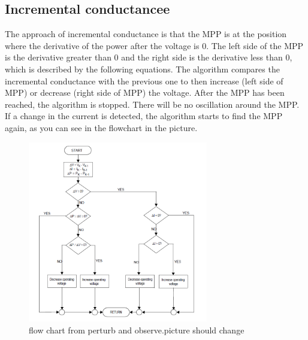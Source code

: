 \subsection{Incremental conductancee}
The approach of incremental conductance is that the MPP is at the position where the derivative of the power after the voltage is 0. The left side of the MPP is the derivative greater than 0 and the right side is the derivative less than 0, which is described by the following equations. The algorithm compares the incremental conductance with the previous one to then increase (left side of MPP) or decrease (right side of MPP) the voltage.  After the MPP has been reached, the algorithm is stopped. There will be no oscillation around the MPP. If a change in the current is detected, the algorithm starts to find the MPP again, as you can see in the flowchart in the picture.

\begin{figure}[htbp]
	\begin{center}
		\includegraphics[width=0.7\textwidth]{../Pictures/P1/Flow_chart/flow_chart_incremental_conductance}
		\caption{flow chart from perturb and observe.picture should change }
		\label{fcinccon}
	\end{center}	
\end{figure}